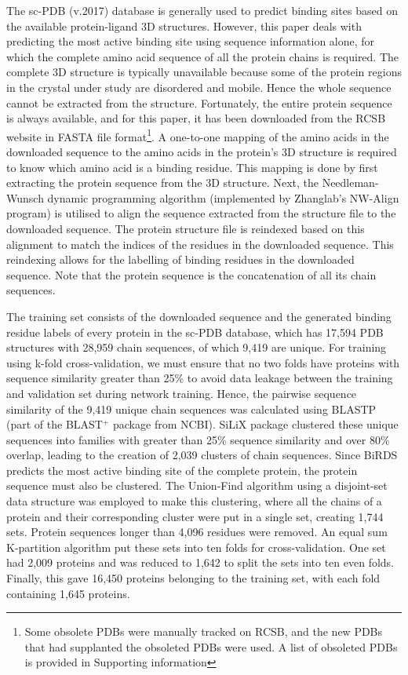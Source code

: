 \documentclass[journal=jcisd8,manuscript=article]{achemso}
\begin{document}
The sc-PDB (v.2017) database is generally used to predict binding sites based on the available protein-ligand 3D structures. However, this paper deals with predicting the most active binding site using sequence information alone, for which the complete amino acid sequence of all the protein chains is required. The complete 3D structure is typically unavailable because some of the protein regions in the crystal under study are disordered and mobile. Hence the whole sequence cannot be extracted from the structure. Fortunately, the entire protein sequence is always available, and for this paper, it has been downloaded from the RCSB\cite{burley2021rcsb} website in FASTA file format\footnote{Some obsolete PDBs were manually tracked on RCSB, and the new PDBs that had supplanted the obsoleted PDBs were used. A list of obsoleted PDBs is provided in Supporting information}. A one-to-one mapping of the amino acids in the downloaded sequence to the amino acids in the protein's 3D structure is required to know which amino acid is a binding residue. This mapping is done by first extracting the protein sequence from the 3D structure. Next, the Needleman-Wunsch dynamic programming algorithm\cite{needleman1970general} (implemented by Zhanglab's NW-Align program\cite{NWAlign}) is utilised to align the sequence extracted from the structure file to the downloaded sequence. The protein structure file is reindexed based on this alignment to match the indices of the residues in the downloaded sequence. This reindexing allows for the labelling of binding residues in the downloaded sequence. Note that the protein sequence is the concatenation of all its chain sequences.

The training set consists of the downloaded sequence and the generated binding residue labels of every protein in the sc-PDB database, which has 17,594 PDB structures with 28,959 chain sequences, of which 9,419 are unique. For training using k-fold cross-validation, we must ensure that no two folds have proteins with sequence similarity greater than 25\% to avoid data leakage between the training and validation set during network training. Hence, the pairwise sequence similarity of the 9,419 unique chain sequences was calculated using BLASTP (part of the BLAST$^+$\cite{camacho2009blast+} package from NCBI). SiLiX\cite{miele2011ultra} package clustered these unique sequences into families with greater than 25\% sequence similarity and over 80\% overlap, leading to the creation of 2,039 clusters of chain sequences. Since BiRDS predicts the most active binding site of the complete protein, the protein sequence must also be clustered. The Union-Find algorithm\cite{kozen1992union} using a disjoint-set data structure was employed to make this clustering, where all the chains of a protein and their corresponding cluster were put in a single set, creating 1,744 sets. Protein sequences longer than 4,096 residues were removed. An equal sum K-partition algorithm put these sets into ten folds for cross-validation. One set had 2,009 proteins and was reduced to 1,642 to split the sets into ten even folds. Finally, this gave 16,450 proteins belonging to the training set, with each fold containing 1,645 proteins.
\end{document}
